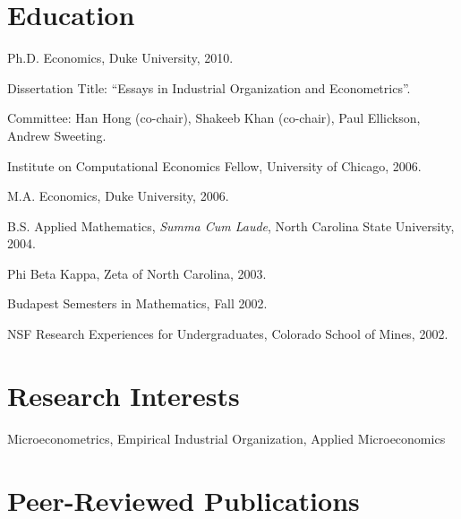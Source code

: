 \documentclass[10pt,letterpaper]{article}
\renewenvironment{itemize}{
  \begin{list}{}{
      \setlength{\leftmargin}{1.5em}
      \setlength{\itemsep}{0.25em}
      \setlength{\parskip}{0pt}
      \setlength{\parsep}{0.25em}
    }
}{
  \end{list}
}
\begin{document}
\section*{Education}

\begin{itemize}
  \item Ph.D. Economics, Duke University, 2010.
    \begin{itemize}
    \item Dissertation Title: ``Essays in Industrial Organization and Econometrics''.
    \item Committee: Han Hong (co-chair), Shakeeb Khan (co-chair), Paul Ellickson, Andrew Sweeting.
    \item Institute on Computational Economics Fellow, University of Chicago, 2006.
    \end{itemize}
  \item M.A. Economics, Duke University, 2006.
  \item B.S. Applied Mathematics, \textit{Summa Cum Laude},
    North Carolina State University, 2004.
    \begin{itemize}
    \item Phi Beta Kappa, Zeta of North Carolina, 2003.
    \item Budapest Semesters in Mathematics, Fall 2002.
    \item NSF Research Experiences for Undergraduates, Colorado School of Mines, 2002.
    \end{itemize}
\end{itemize}

\section*{Research Interests}

Microeconometrics, Empirical Industrial Organization, Applied Microeconomics

\section*{Peer-Reviewed Publications}
\end{document}
